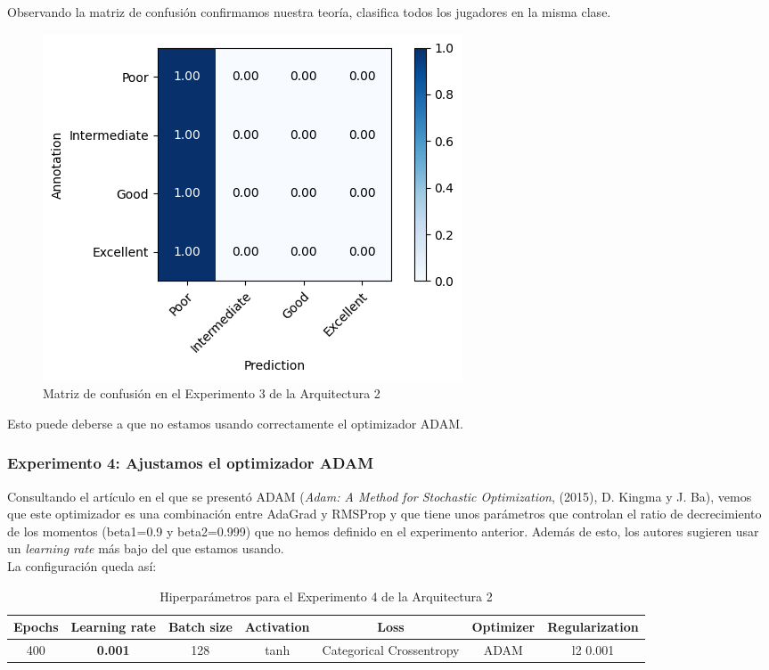 \documentclass{article}
\begin{document}
			Observando la matriz de confusi\'on confirmamos nuestra teor\'ia, clasifica todos los jugadores en la misma clase.
			\begin{figure}[!h]
				\begin{center}
					\includegraphics[scale=0.7]{d-cm-a2-e3.png}		
					\caption{Matriz de confusi\'on en el Experimento 3 de la Arquitectura 2}	
					\label{d-cm-a2-e3}
				\end{center}
			\end{figure}
			
			Esto puede deberse a que no estamos usando correctamente el optimizador ADAM.
			
			
		\subsubsection{Experimento 4: Ajustamos el optimizador ADAM}
		\label{d-s-a2-e4}
			Consultando el art\'iculo en el que se present\'o ADAM (\textit{Adam: A Method for Stochastic Optimization}, (2015), D. Kingma y J. Ba), vemos que este optimizador es una combinaci\'on entre AdaGrad y RMSProp y que tiene unos par\'ametros que controlan el ratio de decrecimiento de los momentos (beta1=0.9 y beta2=0.999) que no hemos definido en el experimento anterior. Adem\'as de esto, los autores sugieren usar un \textit{learning rate} m\'as bajo del que estamos usando.\\
			
			La configuraci\'on queda as\'i:
			\begin{table}[!h]
				\begin{center}
					\begin{tabular}{| c | c | c | c | c | c | c |}
						\textbf{Epochs} & \textbf{Learning rate} & \textbf{Batch size} & \textbf{Activation} & \textbf{Loss} & \textbf{Optimizer} & \textbf{Regularization} \\ \hline
						400 & \textbf{0.001} & 128 & tanh & Categorical Crossentropy & ADAM & l2 0.001
					\end{tabular}
					\caption{Hiperpar\'ametros para el Experimento 4 de la Arquitectura 2}
					\label{tab:hip-d-a2-e4}
				\end{center}
			\end{table}
			
\end{document}
